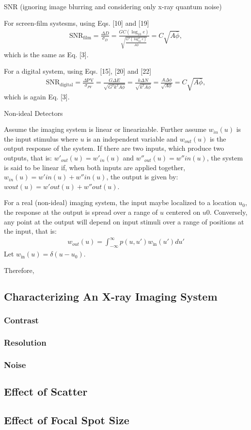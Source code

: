 \documentclass[mphy386-notes.tex]{subfiles}
\begin{document}
SNR (ignoring image blurring and considering only x-ray quantum noise)

For screen-film systesms, using Eqs. [10] and [19]
\begin{align}
  \text{SNR}_{\text{film}} = \frac{\Delta D}{\sigma_D} = \frac{GC(\log_{10}e)}{\sqrt{\frac{G^2(\log_{10}^2e)}{A\bar{\phi}}}} = C\sqrt{A\bar{\phi}},
\end{align}
which is the same as Eq. [3]. 

For a digital system, using Eqs. [15], [20] and [22]
\begin{align}
  \text{SNR}_{\text{digital}} = \frac{\Delta \text{PV}}{\sigma_{PV}} = \frac{G\Delta E}{\sqrt{G^2 k^2 A\phi}} = \frac{k\Delta N}{\sqrt{k^2 A\phi}} = \frac{A\Delta \phi}{\sqrt{A\phi}} = C\sqrt{A\bar{\phi}},
\end{align}
which is again Eq. [3].

Non-ideal Detectors

Assume the imaging system is linear or linearizable. Further assume $w_{in}(u)$
is the input stimulus where $u$ is an independent variable and $w_{out}(u)$ is
the output response of the system. If there are two inputs, which produce two
outputs, that is: $w'_{out}(u) = w'_{in}(u)$ and $w''_{out}(u) = w''in(u)$, the
system is said to be linear if, when both inputs are applied together, $w_{in}(u) =
w'in(u) + w''in(u)$, the output is given by: $wout(u) = w'out(u) + w''out(u)$.

For a real (non-ideal) imaging system, the input maybe localized to a location
$u_0$, the response at the output is spread over a range of $u$ centered on
$u0$. Conversely, any point at the output will depend on input stimuli over a
range of positions at the input, that is:
\begin{align*}
  w_{out}(u) = \int_{-\infty}^{\infty} p(u, u') w_{\text{in}}(u')du'
\end{align*}
Let $w_{\text{in}}(u) = \delta(u - u_0)$. 


Therefore,


\subsection{Characterizing An X-ray Imaging System}
\subsubsection{Contrast}
\subsubsection{Resolution}
\subsubsection{Noise}
\subsection{Effect of Scatter}
\subsection{Effect of Focal Spot Size}


\pagebreak
\end{document}
